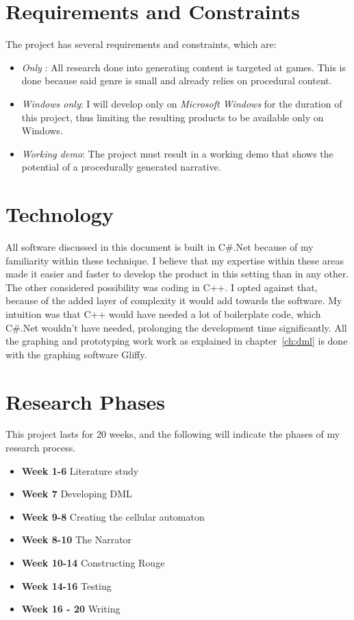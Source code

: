 \section{Requirements and Constraints}
The project has several requirements and constraints, which are:
\begin{itemize}
\item \textit{Only} \rogue:		All research done into generating content is targeted at \rogue games. This is done because said genre is small and already relies on procedural content.
\item \textit{Windows only}: 	I will develop only on \textit{Microsoft Windows} for the duration of this project, thus limiting the resulting products to be available only on Windows.
\item \textit{Working demo}: 	The project must result in a working demo that shows the potential of a procedurally generated narrative.
\end{itemize}

\section{Technology}
All software discussed in this document is built in C\#.Net because of my familiarity within these technique. 
I believe that my expertise within these areas made it easier and faster to develop the product in this setting than in any other.
The other considered possibility was coding in C++.
I opted against that, because of the added layer of complexity it would add towards the software.
My intuition was that C++ would have needed a lot of boilerplate code, which C\#.Net wouldn't have needed, prolonging the development time significantly. 
All the graphing and prototyping work work as explained in chapter~\ref{ch:dml} is done with the graphing software Gliffy.
\section{Research Phases}
This project lasts for 20 weeks, and the following will indicate the phases of my research process.

\begin{itemize}
	\item \textbf{Week 1-6} Literature study
	\item \textbf{Week 7} Developing DML
	\item \textbf{Week 9-8} Creating the cellular automaton
	\item \textbf{Week 8-10} The Narrator
	\item \textbf{Week 10-14} Constructing Rouge
	\item \textbf{Week 14-16} Testing
	\item \textbf{Week 16 - 20} Writing
\end{itemize}